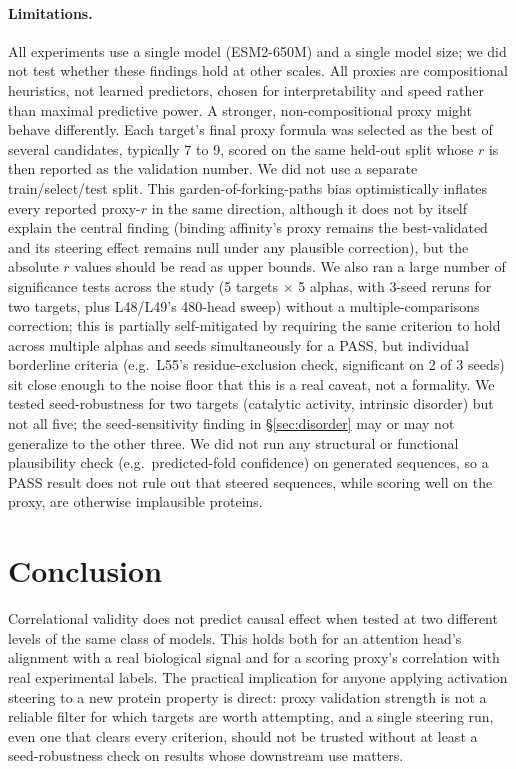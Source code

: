 \documentclass{article}
\begin{document}
\paragraph{Limitations.} All experiments use a single model
(ESM2-650M) and a single model size; we did not test whether these
findings hold at other scales. All proxies are compositional heuristics,
not learned predictors, chosen for interpretability and speed rather
than maximal predictive power. A stronger, non-compositional proxy
might behave differently. Each target's final proxy formula was
selected as the best of several candidates, typically 7 to 9, scored on
the same held-out split whose $r$ is then reported as the validation
number. We did not use a separate train/select/test split. This
garden-of-forking-paths bias optimistically inflates every reported
proxy-$r$ in the same direction, although it does not by itself
explain the central finding (binding affinity's proxy remains the
best-validated and its steering effect remains null under any
plausible correction), but the absolute $r$ values should be read as
upper bounds. We also ran a large number of significance tests across
the study (5 targets $\times$ 5 alphas, with 3-seed reruns for two
targets, plus L48/L49's 480-head sweep) without a multiple-comparisons
correction; this is partially self-mitigated by requiring the same
criterion to hold across multiple alphas and seeds simultaneously for
a PASS, but individual borderline criteria (e.g.\ L55's
residue-exclusion check, significant on 2 of 3 seeds) sit close enough
to the noise floor that this is a real caveat, not a formality. We
tested seed-robustness for two targets (catalytic activity, intrinsic
disorder) but not all five; the seed-sensitivity finding in
\S\ref{sec:disorder} may or may not generalize to the other three. We
did not run any structural or functional plausibility check (e.g.\
predicted-fold confidence) on generated sequences, so a PASS result
does not rule out that steered sequences, while scoring well on the
proxy, are otherwise implausible proteins.

\section{Conclusion}

Correlational validity does not predict causal effect when tested at two
different levels of the same class of models. This holds both for an
attention head's alignment with a real biological signal and for a
scoring proxy's correlation with real experimental labels. The
practical implication for anyone applying activation steering to a new
protein property is direct: proxy validation strength is not a
reliable filter for which targets are worth attempting, and a single
steering run, even one that clears every criterion, should not be
trusted without at least a seed-robustness check on results whose
downstream use matters.



\end{document}
